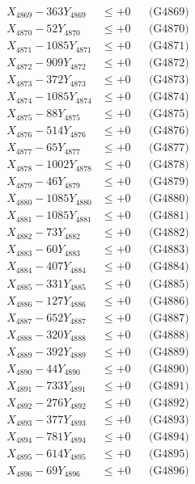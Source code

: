 \documentclass[a4paper,10pt]{article}
\begin{document}
{\begin{align}
X_{4869} - 363Y_{4869} &\leq +0 && \text{(G4869)} \\
X_{4870} - 52Y_{4870} &\leq +0 && \text{(G4870)} \\
\allowbreak
X_{4871} - 1085Y_{4871} &\leq +0 && \text{(G4871)} \\
X_{4872} - 909Y_{4872} &\leq +0 && \text{(G4872)} \\
X_{4873} - 372Y_{4873} &\leq +0 && \text{(G4873)} \\
X_{4874} - 1085Y_{4874} &\leq +0 && \text{(G4874)} \\
X_{4875} - 88Y_{4875} &\leq +0 && \text{(G4875)} \\
X_{4876} - 514Y_{4876} &\leq +0 && \text{(G4876)} \\
X_{4877} - 65Y_{4877} &\leq +0 && \text{(G4877)} \\
X_{4878} - 1002Y_{4878} &\leq +0 && \text{(G4878)} \\
X_{4879} - 46Y_{4879} &\leq +0 && \text{(G4879)} \\
X_{4880} - 1085Y_{4880} &\leq +0 && \text{(G4880)} \\
\allowbreak
X_{4881} - 1085Y_{4881} &\leq +0 && \text{(G4881)} \\
X_{4882} - 73Y_{4882} &\leq +0 && \text{(G4882)} \\
X_{4883} - 60Y_{4883} &\leq +0 && \text{(G4883)} \\
X_{4884} - 407Y_{4884} &\leq +0 && \text{(G4884)} \\
X_{4885} - 331Y_{4885} &\leq +0 && \text{(G4885)} \\
X_{4886} - 127Y_{4886} &\leq +0 && \text{(G4886)} \\
X_{4887} - 652Y_{4887} &\leq +0 && \text{(G4887)} \\
X_{4888} - 320Y_{4888} &\leq +0 && \text{(G4888)} \\
X_{4889} - 392Y_{4889} &\leq +0 && \text{(G4889)} \\
X_{4890} - 44Y_{4890} &\leq +0 && \text{(G4890)} \\
\allowbreak
X_{4891} - 733Y_{4891} &\leq +0 && \text{(G4891)} \\
X_{4892} - 276Y_{4892} &\leq +0 && \text{(G4892)} \\
X_{4893} - 377Y_{4893} &\leq +0 && \text{(G4893)} \\
X_{4894} - 781Y_{4894} &\leq +0 && \text{(G4894)} \\
X_{4895} - 614Y_{4895} &\leq +0 && \text{(G4895)} \\
X_{4896} - 69Y_{4896} &\leq +0 && \text{(G4896)} \\

\end{align}}
\end{document}
